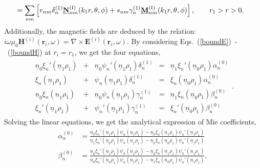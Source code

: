 \documentclass[journal=jacsat,manuscript=article,layout=traditional]{achemso}
\newcommand{\norF}[1]{\underline{\vb{#1}}}
\newcommand{\nr}{\underline{n}}
\newcommand{\RomanI}{\scriptsize\textrm{I}}
\begin{document}
\begin{appendix}
\begin{subequations}
\begin{align}
            &= \sum_{nm} \left[r_{nm}\delta_n^{(1)}\norF{N}_{nm}^{(\RomanI)}(k_1r,\theta,\phi) + s_{nm}\gamma_n^{(1)}\norF{M}_{nm}^{(\RomanI)}(k_1r,\theta,\phi)\right], \qquad r_1>r>0.
    \end{align}
    \label{Eq:Esimplecavityexpand}%
\end{subequations}
Additionally, the magnetic fields are deduced by the relation: $i\omega\mu_0\mathbf{H}^{(i)}(\mathbf{r}_{i},\omega) = \nabla\times\mathbf{E}^{(i)}(\mathbf{r}_{i},\omega)$.
By considering Eqs.~(\ref{boundE})~-~(\ref{boundH}) at $r_i=r_1$, we get the four equations,
\begin{align}
    \begin{array}{rlrlr}
    \nr_0\xi_n'(\nr_1\rho_1) &+& \nr_0\psi_n'(\nr_1\rho_1)\delta_n^{(1)} &=& 
    \nr_1\xi_n'(\nr_0\rho_1)\alpha_n^{(0)} \\
    \xi_n(\nr_1\rho_1) &+& \psi_n(\nr_1\rho_1)\delta_n^{(1)} &=& 
    \xi_n(\nr_0\rho_1)\alpha_n^{(0)} \\
    \nr_0\xi_n(\nr_1\rho_1) &+& \nr_0\psi_n(\nr_1\rho_1)\gamma_n^{(1)} &=& 
    \nr_1\xi_n(\nr_0\rho_1)\beta_n^{(0)}\\
    \xi_n'(\nr_1\rho_1) &+& \psi_n'(\nr_1\rho_1)\gamma_n^{(1)} &=& 
    \xi_n'(\nr_0\rho_1)\beta_n^{(0)}
    \end{array}.
\end{align}
Solving the linear equations, we get the analytical expression of Mie coefficients,
\begin{subequations}
    \begin{align}
        \alpha_n^{(0)} &=
        \frac{\nr_0\xi_n'(\nr_1\rho_1)\psi_n(\nr_1\rho_1)-\nr_0\xi_n(\nr_1\rho_1)\psi_n'(\nr_1\rho_1)}
        {\nr_1\xi_n'(\nr_0\rho_1)\psi_n(\nr_1\rho_1)-\nr_0\xi_n(\nr_0\rho_1)\psi_n'(\nr_1\rho_1)}\\
        \beta_n^{(0)} &=
        \frac{\nr_0\xi_n'(\nr_1\rho_1)\psi_n(\nr_1\rho_1)-\nr_0\xi_n(\nr_1\rho_1)\psi_n'(\nr_1\rho_1)}
        {\nr_0\xi_n'(\nr_0\rho_1)\psi_n(\nr_1\rho_1)-\nr_1\xi_n(\nr_0\rho_1)\psi_n'(\nr_1\rho_1)},\\

\end{align}
\end{subequations}
\end{appendix}
\end{document}

